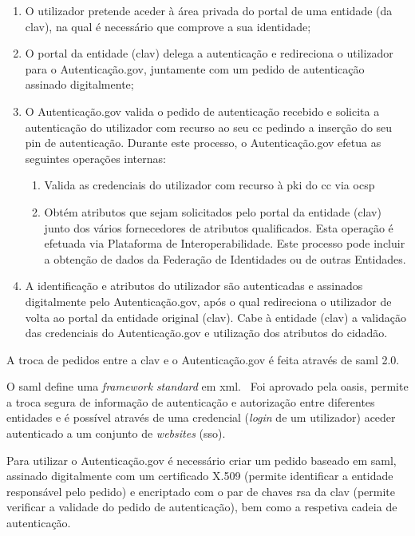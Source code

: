 \begin{enumerate}
    \item O utilizador pretende aceder à área privada do portal de uma entidade (da \acrshort{clav}), na qual é necessário que comprove a sua identidade;
    \item O portal da entidade (\acrshort{clav}) delega a autenticação e redireciona o utilizador para o Autenticação.gov, juntamente com um pedido de autenticação assinado digitalmente;
    \item O Autenticação.gov valida o pedido de autenticação recebido e solicita a autenticação do utilizador com recurso ao seu \acrshort{cc} pedindo a inserção do seu \acrshort{pin} de autenticação. Durante este processo, o Autenticação.gov efetua as seguintes operações internas:
    \begin{enumerate}
        \item Valida as credenciais do utilizador com recurso à \acrshort{pki} do \acrshort{cc} via \acrshort{ocsp}
        \item Obtém atributos que sejam solicitados pelo portal da entidade (\acrshort{clav}) junto dos vários fornecedores de atributos qualificados. Esta operação é efetuada via Plataforma de Interoperabilidade. Este processo pode incluir a obtenção de dados da Federação de Identidades ou de outras Entidades.
    \end{enumerate}
    \item A identificação e atributos do utilizador são autenticadas e assinados digitalmente pelo Autenticação.gov, após o qual redireciona o utilizador de volta ao portal da entidade original (\acrshort{clav}). Cabe à entidade (\acrshort{clav}) a validação das credenciais do Autenticação.gov e utilização dos atributos do cidadão.
\end{enumerate}

A troca de pedidos entre a \acrshort{clav} e o Autenticação.gov é feita através de \acrshort{saml} 2.0.

O \acrfull{saml} define uma \textit{framework} \textit{standard} em \acrshort{xml}.~\cite{sam2man} Foi aprovado pela \acrshort{oasis}, permite a troca segura de informação de autenticação e autorização entre diferentes entidades e é possível através de uma credencial (\textit{login} de um utilizador) aceder autenticado a um conjunto de \textit{websites} (\acrshort{sso}).

Para utilizar o Autenticação.gov é necessário criar um pedido baseado em \acrshort{saml}, assinado digitalmente com um certificado X.509 (permite identificar a entidade responsável pelo pedido) e encriptado com o par de chaves \acrshort{rsa} da \acrshort{clav} (permite verificar a validade do pedido de autenticação), bem como a respetiva cadeia de autenticação.~\cite{otavioTese}


